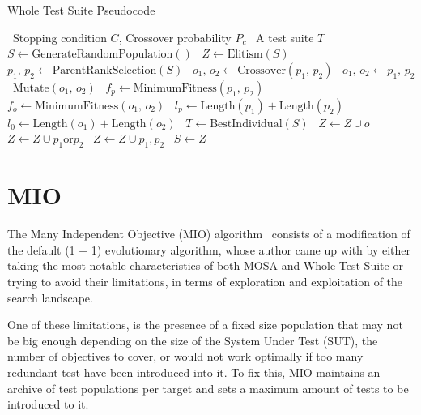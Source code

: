 \documentclass[%
  chapterprefix=false,%
  open=right,%
  twoside=true,%
  paper=a4,%
  logofile={Figures/logo.png},%
  thesistype=master,%
  UKenglish,%
]{se2thesis}
\begin{document}
\begin{algorithm}[htb]
  \centering
  \caption{Whole Test Suite Pseudocode}\label{alg:WTSpseudo}
  \begin{algorithmic}[1]
    \Require~Stopping condition \(C\), Crossover probability \(P_c\)
    \Ensure~A test suite \(T\)
    \State~\(S \gets \text{GenerateRandomPopulation}()\)
      \State~\(Z \gets \text{Elitism}(S)\)
        \State~\(p_1,\, p_2 \gets \text{ParentRankSelection}(S)\)
          \State~\(o_1,\, o_2 \gets \text{Crossover}(p_1,\, p_2)\)
        \Else\@
          \State~\(o_1,\, o_2 \gets p_1,\, p_2\)
        \EndIf\@
        \State~\(\text{Mutate}(o_1,\, o_2)\)
        \State~\(f_p \gets \text{MinimumFitness}(p_1,\, p_2)\)
        \State~\(f_o \gets \text{MinimumFitness}(o_1,\, o_2)\)
        \State~\(l_p \gets \text{Length}(p_1) + \text{Length}(p_2)\)
        \State~\(l_0 \gets \text{Length}(o_1) + \text{Length}(o_2)\)
        \State~\(T \gets \text{BestIndividual}(S)\)
              \State~\(Z \gets Z \cup {o}\)
            \Else\@
              \State~\(Z \gets Z \cup {p_1 \text{or} p_2}\)
            \EndIf\@
          \EndFor\@
        \Else\@
          \State~\(Z \gets Z \cup {p_1, p_2}\)
        \EndIf\@
      \EndWhile\@
      \State~\(S \gets Z\)
    \EndWhile\@
  \end{algorithmic}
\end{algorithm}

\section{MIO}

The Many Independent Objective (MIO) algorithm~\cite{DBLP:journals/infsof/Arcuri18} consists of a modification of the default (1 + 1) evolutionary algorithm, whose author came up with by either taking the most notable characteristics of both MOSA and Whole Test Suite or trying to avoid their limitations, in terms of exploration and exploitation of the search landscape.

One of these limitations, is the presence of a fixed size population that may not be big enough depending on the size of the System Under Test (SUT), the number of objectives to cover, or would not work optimally if too many redundant test have been introduced into it.
To fix this, MIO maintains an archive of test populations per target and sets a maximum amount of tests to be introduced to it.
\end{document}

